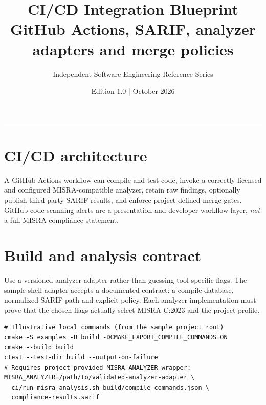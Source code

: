 \documentclass[10pt,letterpaper]{article}
\title{\vspace{-2.3em}\color{DeepNavy}\Huge\bfseries CI/CD Integration Blueprint\\[0.45em]\large\normalfont\color{Teal} GitHub Actions, SARIF, analyzer adapters and merge policies}
\author{Independent Software Engineering Reference Series}
\date{Edition 1.0 \quad | \quad October 2026}
\begin{document}
\maketitle
\vspace{-0.4em}
\begin{center}\color{Slate}\rule{0.83\linewidth}{0.4pt}\end{center}
\DocNotes
\tableofcontents
\newpage

\section{CI/CD architecture}
A GitHub Actions workflow can compile and test code, invoke a correctly licensed and configured MISRA-compatible analyzer, retain raw findings, optionally publish third-party SARIF results, and enforce project-defined merge gates. GitHub code-scanning alerts are a presentation and developer workflow layer, \emph{not} a full MISRA compliance statement.
\begin{center}\end{center}
\section{Build and analysis contract}
Use a versioned analyzer adapter rather than guessing tool-specific flags. The sample shell adapter accepts a documented contract: a compile database, normalized SARIF path and explicit policy. Each analyzer implementation must prove that the chosen flags actually select MISRA C:2023 and the project profile.
\begin{lstlisting}[style=plaincode]
# Illustrative local commands (from the sample project root)
cmake -S examples -B build -DCMAKE_EXPORT_COMPILE_COMMANDS=ON
cmake --build build
ctest --test-dir build --output-on-failure
# Requires project-provided MISRA_ANALYZER wrapper:
MISRA_ANALYZER=/path/to/validated-analyzer-adapter \
  ci/run-misra-analysis.sh build/compile_commands.json \
  compliance-results.sarif
\end{lstlisting}
\end{document}
